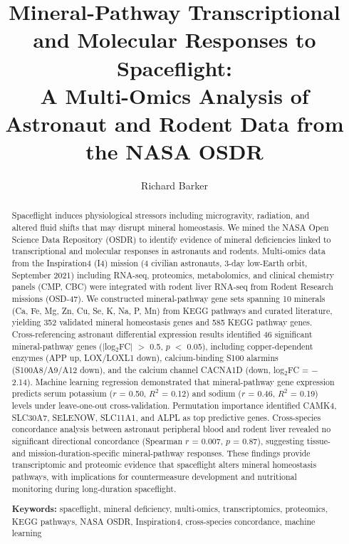 \documentclass[11pt,a4paper]{article}
\title{Mineral-Pathway Transcriptional and Molecular Responses to Spaceflight: \\
       A Multi-Omics Analysis of Astronaut and Rodent Data from the NASA OSDR}
\author{Richard Barker}
\date{}
\begin{document}
\maketitle

\begin{abstract}
\noindent
Spaceflight induces physiological stressors including microgravity, radiation, and altered fluid shifts that may disrupt mineral homeostasis. We mined the NASA Open Science Data Repository (OSDR) to identify evidence of mineral deficiencies linked to transcriptional and molecular responses in astronauts and rodents. Multi-omics data from the Inspiration4 (I4) mission (4 civilian astronauts, 3-day low-Earth orbit, September 2021) including RNA-seq, proteomics, metabolomics, and clinical chemistry panels (CMP, CBC) were integrated with rodent liver RNA-seq from Rodent Research missions (OSD-47). We constructed mineral-pathway gene sets spanning 10 minerals (Ca, Fe, Mg, Zn, Cu, Se, K, Na, P, Mn) from KEGG pathways and curated literature, yielding 352 validated mineral homeostasis genes and 585 KEGG pathway genes. Cross-referencing astronaut differential expression results identified 46 significant mineral-pathway genes (|log$_2$FC| $>$ 0.5, $p$ $<$ 0.05), including copper-dependent enzymes (APP up, LOX/LOXL1 down), calcium-binding S100 alarmins (S100A8/A9/A12 down), and the calcium channel CACNA1D (down, log$_2$FC = $-$2.14). Machine learning regression demonstrated that mineral-pathway gene expression predicts serum potassium ($r$ = 0.50, $R^2$ = 0.12) and sodium ($r$ = 0.46, $R^2$ = 0.19) levels under leave-one-out cross-validation. Permutation importance identified CAMK4, SLC30A7, SELENOW, SLC11A1, and ALPL as top predictive genes. Cross-species concordance analysis between astronaut peripheral blood and rodent liver revealed no significant directional concordance (Spearman $r$ = 0.007, $p$ = 0.87), suggesting tissue- and mission-duration-specific mineral-pathway responses. These findings provide transcriptomic and proteomic evidence that spaceflight alters mineral homeostasis pathways, with implications for countermeasure development and nutritional monitoring during long-duration spaceflight.

\medskip
\noindent\textbf{Keywords:} spaceflight, mineral deficiency, multi-omics, transcriptomics, proteomics, KEGG pathways, NASA OSDR, Inspiration4, cross-species concordance, machine learning
\end{abstract}
\end{document}
